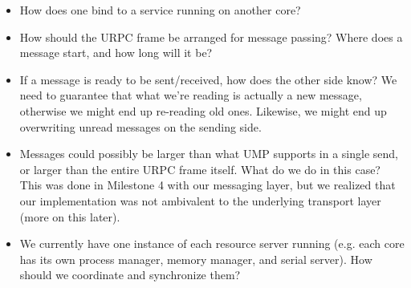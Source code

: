 \begin{itemize}[itemsep=0pt]
    \item How does one bind to a service running on another core?
    \item How should the URPC frame be arranged for message passing? Where does a message start, and how long will it be?
    \item If a message is ready to be sent/received, how does the other side know? We need to guarantee that what we're reading is actually a new message, otherwise we might end up re-reading old ones. Likewise, we might end up overwriting unread messages on the sending side.
    \item Messages could possibly be larger than what UMP supports in a single send, or larger than the entire URPC frame itself. What do we do in this case? This was done in Milestone 4 with our messaging layer, but we realized that our implementation was not ambivalent to the underlying transport layer (more on this later).
    \item We currently have one instance of each resource server running (e.g. each core has its own process manager, memory manager, and serial server). How should we coordinate and synchronize them?
\end{itemize}

